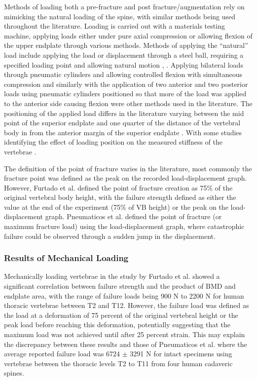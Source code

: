 Methods of loading both a pre-fracture and post fracture/augmentation
rely on mimicking the natural loading of the spine, with similar methods
being used throughout the literature. Loading is carried out with a
materials testing machine, applying loads either under pure axial
compression or allowing flexion of the upper endplate through various
methods. Methods of applying the ``natural'' load include applying the
load or displacement through a steel ball, requiring a specified loading
point and allowing natural motion \cite{tarsuslugil2013development},
\cite{furtado2007biomechanical}.
Applying bilateral
loads through pneumatic cylinders and allowing controlled flexion with
simultaneous compression \cite{ananthakrishnan2005effect} and similarly with
the application of
two anterior and two posterior loads using pneumatic cylinders
positioned so that more of the load was applied to the anterior side
causing flexion \cite{pneumaticos2013effect} were other methods used in the
literature.
The positioning of the applied load differs in the literature varying
between the mid point of the superior endplate \cite{Barr2000} and one quarter
of the distance of the vertebral body in from the anterior margin of the
superior endplate \cite{belkoff2001biomechanics}. With some studies identifying the effect of loading position on the measured stiffness of the vertebrae \cite{Wijayathunga2008}.

The definition of the point of fracture varies in the literature, most
commonly the fracture point was defined as the peak on the recorded
load-displacement graph. However, Furtado et al. \cite{furtado2007biomechanical} defined the point of
fracture creation as 75\% of the original vertebral body height, with
the failure strength defined as either the value at the end of the
experiment (75\% of VB height) or the peak on the load-displacement
graph. Pneumaticos et al. \cite{pneumaticos2013effect} defined the point of
fracture (or
maximum fracture load) using the load-displacement graph, where
catastrophic failure could be observed through a sudden jump in the
displacement.

\subsubsection{Results of Mechanical Loading
}\label{results-of-mechanical-loading}

Mechanically loading vertebrae in the study by Furtado et al. \cite{furtado2007biomechanical} showed a
significant correlation between failure strength and the product of BMD
and endplate area, with the range of failure loads being 900 N to 2200 N
for human thoracic vertebrae between T2 and T12. However, the failure
load was defined as the load at a deformation of 75 percent of the
original vertebral height or the peak load before reaching this
deformation, potentially suggesting that the maximum load was not
achieved until after 25 percent strain. This may explain the discrepancy
between these results and those of Pneumaticos et al.
\cite{pneumaticos2013effect} where the
average reported failure load was 6724 $\pm$ 3291 N for intact specimens
using vertebrae between the thoracic levels T2 to T11 from four human
cadaveric spines.

